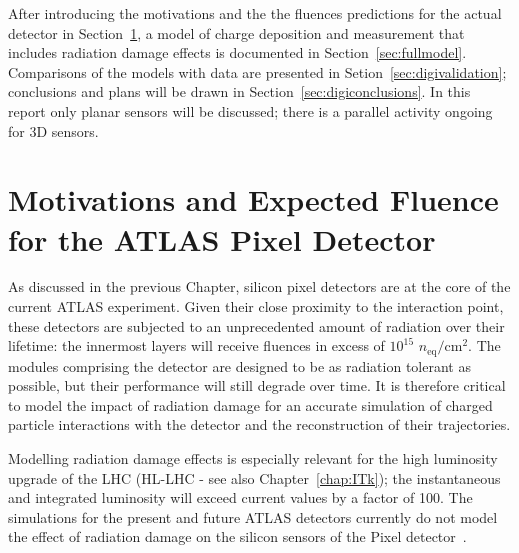 
After introducing the motivations and the the fluences predictions for the actual detector in 
Section~\ref{sec:expflu}, a model of charge deposition and measurement that includes radiation 
damage effects is documented in Section~\ref{sec:fullmodel}. Comparisons of the models with data are 
presented in Setion~\ref{sec:digivalidation}; conclusions and plans will be drawn in Section~\ref{sec:digiconclusions}.
In this report only planar sensors will be discussed; there is a parallel activity ongoing for 3D sensors.

\section{Motivations and Expected Fluence for the ATLAS Pixel Detector}
\label{sec:expflu}
As discussed in the previous Chapter, silicon pixel detectors are at 
the core of the current ATLAS  experiment.  Given their close proximity to the interaction point, these 
detectors are subjected to an 
unprecedented amount of radiation over their lifetime:  the innermost layers will receive 
fluences in excess of $10^{15}$  $n_\text{eq}/\text{cm}^2$. The modules comprising the detector are designed to be as radiation tolerant as possible, but their performance will still degrade over time.  It is therefore critical to model the impact of radiation damage for an accurate simulation of charged particle interactions with the detector and the reconstruction of their trajectories.  

Modelling radiation damage effects is especially relevant for the high luminosity upgrade of the LHC (HL-LHC - see also Chapter~\ref{chap:ITk}); the instantaneous and integrated luminosity will exceed current values by a factor of 100.  The simulations for the present and future ATLAS detectors currently do not model the effect of radiation damage on the silicon sensors of the Pixel detector~\cite{Aad:2010ah,ATL-PHYS-PUB-2016-025}.

